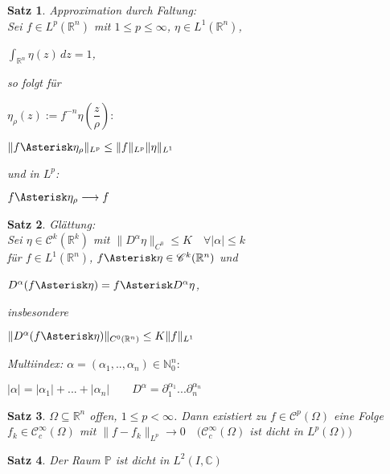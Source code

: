 \documentclass[11pt]{memoir}
\theoremstyle{changebreak}
\newtheorem{Satz}{Satz}[chapter]
\begin{document}
\begin{Satz}
\emph{Approximation durch Faltung}: \\
Sei $f \in L^p(\mathbb R^n)$ mit $1 \leq p \leq \infty$, $\eta \in L^1(\mathbb R^n)$, 
\begin{center}
	$\int_{\mathbb R^n} \eta(z) \,dz = 1$, 
\end{center}
so folgt für 
\begin{center}
	$\eta_\rho (z):= f^{-n} \eta\left(\dfrac{z}{\rho}\right):$
\end{center}
\begin{center}
	$\|f \Asterisk \eta_\rho\|_{L^p} \leq \|f\|_{L^p} \|\eta\|_{L^1}$
\end{center}
und in $L^p$:
\begin{center}
	$f \Asterisk \eta_\rho \longrightarrow f$
\end{center}
\end{Satz}


\begin{Satz}
\emph{Glättung}: \\
Sei $\eta \in \mathscr C^k(\mathbb R^k)$ mit $\|D^\alpha \eta\|_{C^0} \leq K \quad \forall |\alpha| \leq k$ \\
für $f \in L^1(\mathbb R^n)$, 
$f \Asterisk \eta \in \mathscr C^k(\mathbb R^n)$ und 
\begin{center}
	$D^\alpha(f \Asterisk \eta) = f \Asterisk D^\alpha \eta$, 
\end{center}
insbesondere
\begin{center}
	$\|D^\alpha (f \Asterisk \eta) \|_{C^0(\mathbb R^n)} \leq K \|f\|_{L^1}$
\end{center}
\emph{Multiindex}: 
$\alpha = (\alpha_1, .., \alpha_n) \in \mathbb N_0^n:$
\begin{center}
	$|\alpha| = |\alpha_1| + ... + |\alpha_n| \qquad D^\alpha = \partial_1^{\alpha_1}... \partial_n^{\alpha_n}$
\end{center}
\end{Satz}


\begin{Satz}
$\Omega \subseteq \mathbb R^n$ offen, $1 \leq p < \infty$. Dann existiert zu $f \in \mathscr C^p(\Omega)$ eine Folge $f_k \in \mathscr C_c^\infty(\Omega)$ mit $\|f-f_k\|_{L^p} \rightarrow 0 \quad (\mathscr C_c^\infty(\Omega)$ ist dicht in $L^p(\Omega))$ 
\end{Satz}

\begin{Satz}
Der Raum $\mathbb P$ ist dicht in $L^2(I, \mathbb C)$
\end{Satz}
\end{document}
